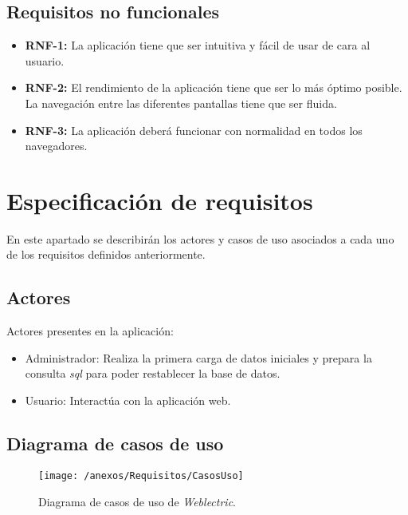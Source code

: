 \subsection{Requisitos no funcionales}

	\begin{itemize}
	
		\item \textbf{RNF-1:} La aplicación tiene que ser intuitiva y fácil de usar de cara al usuario.
		\item \textbf{RNF-2:} El rendimiento de la aplicación tiene que ser lo más óptimo posible. La navegación entre las diferentes pantallas tiene que ser fluida. 
		\item \textbf{RNF-3:} La aplicación deberá funcionar con normalidad en todos los navegadores.
		
	\end{itemize}
	
\newpage

\section{Especificación de requisitos}

En este apartado se describirán los actores y casos de uso asociados a cada uno de los requisitos definidos anteriormente. 

\subsection{Actores}

Actores presentes en la aplicación:

\begin{itemize}
	\item Administrador: Realiza la primera carga de datos iniciales y prepara la consulta \textit{sql} para poder restablecer la base de datos.
	\item Usuario: Interactúa con la aplicación web.
\end{itemize}

\subsection{Diagrama de casos de uso}

\begin{figure}[h]
	\centering
	\texttt{[image: /anexos/Requisitos/CasosUso]}
	\caption{Diagrama de casos de uso de \textit{Weblectric}.}
	\label{fig:casosUso}
\end{figure}

